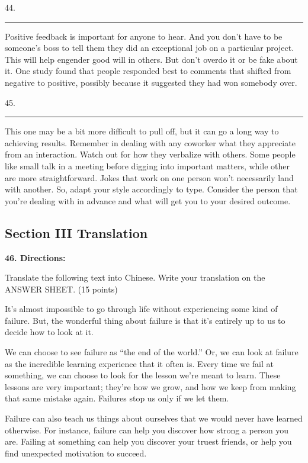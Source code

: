 \documentclass[UTF8,11pt]{ctexart}
\begin{document}
44. \par\noindent\rule{.95\linewidth}{.4pt}\par


Positive feedback is important for anyone to hear. And you don’t have to be someone’s boss to tell them they did an exceptional job on a particular project. This will help engender good will in others. But don’t overdo it or be fake about it. One study found that people responded best to comments that shifted from negative to positive, possibly because it suggested they had won somebody over.


45. \par\noindent\rule{.95\linewidth}{.4pt}\par


This one may be a bit more difficult to pull off, but it can go a long way to achieving results. Remember in dealing with any coworker what they appreciate from an interaction. Watch out for how they verbalize with others. Some people like small talk in a meeting before digging into important matters, while other are more straightforward. Jokes that work on one person won’t necessarily land with another. So, adapt your style accordingly to type. Consider the person that you’re dealing with in advance and what will get you to your desired outcome.


\subsection*{\textbf{Section III Translation}}


\textbf{46. Directions:}


Translate the following text into Chinese. Write your translation on the ANSWER SHEET. (15 points)


It’s almost impossible to go through life without experiencing some kind of failure. But, the wonderful thing about failure is that it’s entirely up to us to decide how to look at it.


We can choose to see failure as “the end of the world.” Or, we can look at failure as the incredible learning experience that it often is. Every time we fail at something, we can choose to look for the lesson we’re meant to learn. These lessons are very important; they’re how we grow, and how we keep from making that same mistake again. Failures stop us only if we let them.


Failure can also teach us things about ourselves that we would never have learned otherwise. For instance, failure can help you discover how strong a person you are. Failing at something can help you discover your truest friends, or help you find unexpected motivation to succeed.
\end{document}
